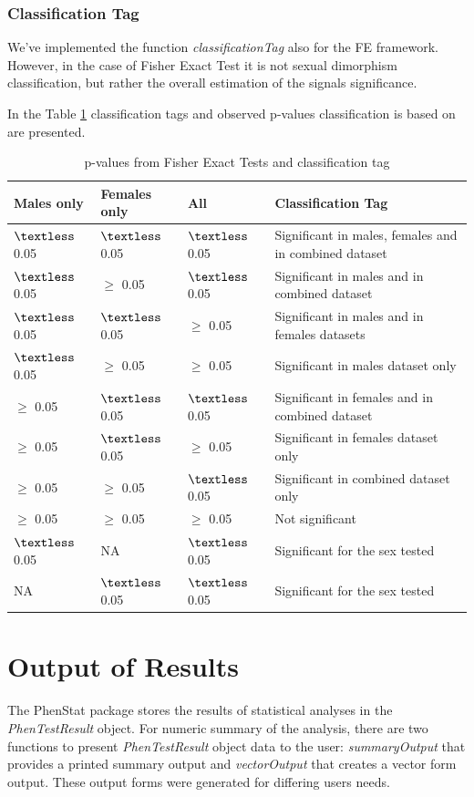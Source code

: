 \documentclass[12pt,a4paper]{article}
\begin{document}
\subsubsection{Classification Tag}
We've implemented the function \textit{classificationTag} also for the FE framework. 
However, in the case of Fisher Exact Test it is not sexual dimorphism classification, but rather the overall estimation of the signals significance.

In the Table \ref{table:06} classification tags and observed p-values classification is based on are presented.

\begin{table}[!h]
\begin{center}
\begin{tabular}{| l | l | l | p{8cm} |}
  \hline
Males only&Females only&All&Classification Tag\\\hline
$\textless$ 0.05&$\textless$ 0.05 &$\textless$ 0.05&Significant in males, females and in combined dataset\\
$\textless$ 0.05&$\geq$ 0.05&$\textless$ 0.05&Significant in males and in combined dataset\\
$\textless$ 0.05&$\textless$ 0.05&$\geq$ 0.05&Significant in males and in females datasets\\
$\textless$ 0.05&$\geq$ 0.05&$\geq$ 0.05&Significant in males dataset only\\
$\geq$ 0.05&$\textless$ 0.05&$\textless$ 0.05&Significant in females and in combined dataset\\
$\geq$ 0.05&$\textless$ 0.05&$\geq$ 0.05&Significant in females dataset only\\
$\geq$ 0.05&$\geq$ 0.05&$\textless$ 0.05&Significant in combined dataset only\\
$\geq$ 0.05&$\geq$ 0.05&$\geq$ 0.05&Not significant\\
$\textless$ 0.05&NA&$\textless$ 0.05&Significant for the sex tested\\
NA&$\textless$ 0.05&$\textless$ 0.05&Significant for the sex tested\\

\hline  
\end{tabular}
\caption{p-values from Fisher Exact Tests and classification tag}\label{table:06}
\end{center}
\end{table}

\section{Output of Results}
\label{section:Results}
The PhenStat package stores the results of statistical analyses in the \textit{PhenTestResult} object.  
For numeric summary of the analysis, there are two functions to present \textit{PhenTestResult} object data to the user: 
\textit{summaryOutput} that provides a printed summary output and \textit{vectorOutput} that creates a vector form output. 
These output forms were generated for differing users needs. 
\end{document}
